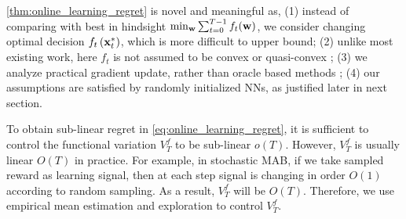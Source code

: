 \cref{thm:online_learning_regret} is novel and meaningful as, (1) instead of comparing with best in hindsight $\min_{{\mathbf{w}}}{\sum_{t=0}^{T-1}{f_t({\mathbf{w}})} }$, we consider changing optimal decision $f_t\left( {\mathbf{x}}_t^* \right)$, which is more difficult to upper bound; (2) unlike most existing work, here $f_t$ is not assumed to be convex \citep{yang2016tracking} or quasi-convex \citep{gao2018online}; (3) we analyze practical gradient update, rather than oracle based methods \citep{suggala2019online,agarwal2019learning} ; (4) our assumptions are satisfied by randomly initialized NNs, as justified later in next section.

To obtain sub-linear regret in \cref{eq:online_learning_regret}, it is sufficient to control the functional variation $V_T^f$ to be sub-linear $o(T)$. However, $V_T^f$ is usually linear $O(T)$ in practice. For example, in stochastic MAB, if we take sampled reward as learning signal, then at each step signal is changing in order $O(1)$ according to random sampling. As a result, $V_T^f$ will be $O(T)$. Therefore, we use empirical mean estimation and exploration to control $V_T^f$.
